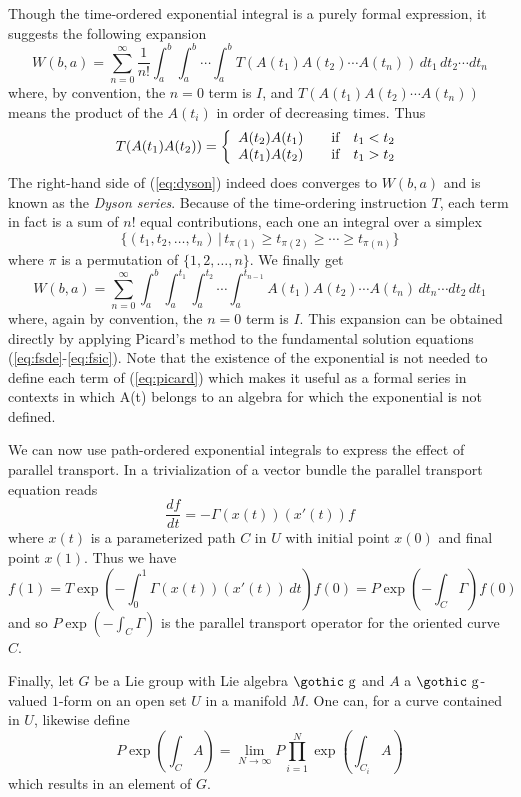 \documentclass[12pt,titlepage]{article}
\def\goth#1{\hbox{\gothic #1}}
\def\gg{{\goth g}}
\begin{document}
Though the time-ordered exponential
integral is a purely formal expression, it suggests the following
expansion 
\begin{equation}\label{eq:dyson}
W(b,a) = \sum_{n=0}^\infty\frac{1}{n!} \int_a^b\int_a^b\cdots\int_a^b
T(A(t_1)A(t_2)\cdots A(t_n))\,dt_1\,dt_2\cdots dt_n
\end{equation}%
where, by convention, the \(n=0\) term is \(I\), and  
\(T(A(t_1)A(t_2)\cdots A(t_n))\) means the product of the
\(A(t_i)\) in order of decreasing times. Thus 
\[
T(A(t_1)A(t_2)) = \left\{\begin{array}{cc}
A(t_2)A(t_1) & \quad\hbox{if}\quad t_1 < t_2 \\
A(t_1)A(t_2) & \quad\hbox{if}\quad t_1 > t_2
\end{array}\right.
\]
The right-hand side of (\ref{eq:dyson}) indeed does converges to \(W(b,a)\)
and is known as the {\em Dyson series\/}. 
%
Because of the time-ordering
instruction \(T\), each term in fact is a sum of \(n!\) equal
contributions, each one an integral over a simplex
\[
\{(t_1,t_2,\dots,t_n)\,|
\,t_{\pi(1)}\ge t_{\pi(2)}\ge\cdots\ge t_{\pi(n)}\}
\] 
where \(\pi\) is a permutation of \(\{1,2,\dots,n\}\). We finally get
\begin{equation}\label{eq:picard}
W(b,a) = \sum_{n=0}^\infty
\int_a^b\int_a^{t_1}\int_a^{t_2}\cdots\int_a^{t_{n-1}}
A(t_1)A(t_2)\cdots A(t_n)\, dt_n\cdots dt_2\,dt_1
\end{equation}%
where, again by convention, the \(n=0\) term is \(I\).
This expansion can be obtained directly by applying Picard's method to
the fundamental solution equations (\ref{eq:fsde}-\ref{eq:fsic}). Note
that the existence of the exponential is not needed to define each term
of (\ref{eq:picard}) which makes it useful as a formal series
in contexts in which A(t) belongs to an algebra for which the
exponential is not defined.

We can now use path-ordered exponential integrals to
express the effect of
parallel transport. In a  trivialization of a vector bundle
the parallel transport equation reads
\[
\frac{df}{dt} = -\Gamma(x(t))(x'(t))f
\]
where \(x(t)\) is a parameterized path \(C\) in \(U\) with initial point
\(x(0)\) and final point \(x(1)\). Thus we have
\[
f(1) = T
\exp\left(-\int_0^1\Gamma(x(t))(x'(t))\,dt\right)f(0)=P\exp\left(-\int_C
\Gamma\right)f(0)
\]
and so \(P\exp\left(-\int_C \Gamma\right) \) is the parallel transport
operator for the oriented curve \(C\).

Finally, let \(G\) be a Lie group with Lie algebra \(\gg\) and \(A \)
a \(\gg\)-valued \(1\)-form on an open set \(U\) in a
 manifold \(M\). One can, for a curve contained in \(U\), likewise define
\begin{equation}%
 P \exp\left(\int_CA \right) =
 \lim_{N\to\infty} P\prod_{i=1}^N \exp\left(\int_{C_i}A \right)
 \end{equation}%
which results in an element of \(G\).
\end{document}
